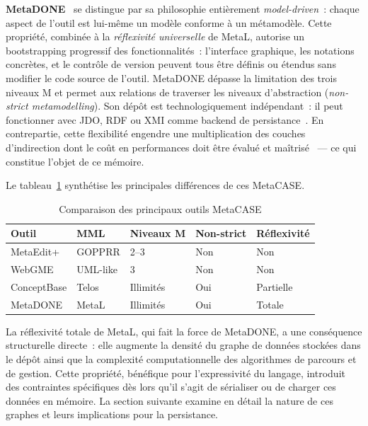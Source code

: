 \textbf{MetaDONE}~\cite{Eng2007} se distingue par sa philosophie entièrement \textit{model-driven}~: chaque aspect de l'outil est lui-même un modèle conforme à un métamodèle. Cette propriété, combinée à la \textit{réflexivité universelle} de MetaL, autorise un bootstrapping progressif des fonctionnalités~: l'interface graphique, les notations concrètes, et le contrôle de version peuvent tous être définis ou étendus sans modifier le code source de l'outil. MetaDONE dépasse la limitation des trois niveaux M et permet aux relations de traverser les niveaux d'abstraction (\textit{non-strict metamodelling}). Son dépôt est technologiquement indépendant~: il peut fonctionner avec JDO, RDF ou XMI comme backend de persistance~\cite{Eng2007}. En contrepartie, cette flexibilité engendre une multiplication des couches d'indirection dont le coût en performances doit être évalué et maîtrisé~\cite{Eng2007} --- ce qui constitue l'objet de ce mémoire.

Le tableau~\ref{tab:metacase} synthétise les principales différences de ces MetaCASE.

\begin{table}[h]
\centering
\caption{Comparaison des principaux outils MetaCASE}
\label{tab:metacase}
\small
\begin{tabular}{lllll}
\hline
\textbf{Outil} & \textbf{MML} & \textbf{Niveaux M} &
\textbf{Non-strict} & \textbf{Réflexivité} \\
\hline
MetaEdit+   & GOPPRR    & 2--3      & Non & Non \\
WebGME      & UML-like  & 3         & Non & Non \\
ConceptBase & Telos     & Illimités & Oui & Partielle \\
MetaDONE    & MetaL     & Illimités & Oui & Totale \\
\hline
\end{tabular}
\end{table}

La réflexivité totale de MetaL, qui fait la force de MetaDONE, a une conséquence structurelle directe~: elle augmente la densité du graphe de données stockées dans le dépôt ainsi que la complexité computationnelle des algorithmes de parcours et de gestion. Cette propriété, bénéfique pour l'expressivité du langage, introduit des contraintes spécifiques dès lors qu'il s'agit de sérialiser ou de charger ces données en mémoire. La section suivante examine en détail la nature de ces graphes et leurs implications pour la persistance.


